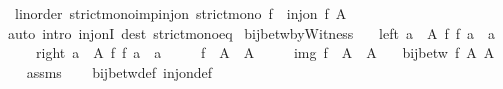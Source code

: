 \begin{isabellebody}
\isamarkupfalse%
\ {\isacharparenleft}{\kern0pt}\ linorder{\isacharparenright}{\kern0pt}\ strict{\isacharunderscore}{\kern0pt}mono{\isacharunderscore}{\kern0pt}imp{\isacharunderscore}{\kern0pt}inj{\isacharunderscore}{\kern0pt}on{\isacharcolon}{\kern0pt}\ {\isachardoublequoteopen}strict{\isacharunderscore}{\kern0pt}mono\ f\ {\isasymLongrightarrow}\ inj{\isacharunderscore}{\kern0pt}on\ f\ A{\isachardoublequoteclose}\isanewline
%
\isadelimproof
\ \ %
\endisadelimproof
%
\isatagproof
{}\isamarkupfalse%
\ {\isacharparenleft}{\kern0pt}auto\ intro{\isacharbang}{\kern0pt}{\isacharcolon}{\kern0pt}\ inj{\isacharunderscore}{\kern0pt}onI\ dest{\isacharcolon}{\kern0pt}\ strict{\isacharunderscore}{\kern0pt}mono{\isacharunderscore}{\kern0pt}eq{\isacharparenright}{\kern0pt}%
\endisatagproof
{\isafoldproof}%
%
\isadelimproof
\isanewline
%
\endisadelimproof
\isanewline
{}\isamarkupfalse%
\ bij{\isacharunderscore}{\kern0pt}betw{\isacharunderscore}{\kern0pt}byWitness{\isacharcolon}{\kern0pt}\isanewline
\ \ \ left{\isacharcolon}{\kern0pt}\ {\isachardoublequoteopen}{\isasymforall}a\ {\isasymin}\ A{\isachardot}{\kern0pt}\ f{\isacharprime}{\kern0pt}\ {\isacharparenleft}{\kern0pt}f\ a{\isacharparenright}{\kern0pt}\ {\isacharequal}{\kern0pt}\ a{\isachardoublequoteclose}\isanewline
\ \ \ \ \ right{\isacharcolon}{\kern0pt}\ {\isachardoublequoteopen}{\isasymforall}a{\isacharprime}{\kern0pt}\ {\isasymin}\ A{\isacharprime}{\kern0pt}{\isachardot}{\kern0pt}\ f\ {\isacharparenleft}{\kern0pt}f{\isacharprime}{\kern0pt}\ a{\isacharprime}{\kern0pt}{\isacharparenright}{\kern0pt}\ {\isacharequal}{\kern0pt}\ a{\isacharprime}{\kern0pt}{\isachardoublequoteclose}\isanewline
\ \ \ \ \ {\isachardoublequoteopen}f\ {\isacharbackquote}{\kern0pt}\ A\ {\isasymsubseteq}\ A{\isacharprime}{\kern0pt}{\isachardoublequoteclose}\isanewline
\ \ \ \ \ img{}{\isacharcolon}{\kern0pt}\ {\isachardoublequoteopen}f{\isacharprime}{\kern0pt}\ {\isacharbackquote}{\kern0pt}\ A{\isacharprime}{\kern0pt}\ {\isasymsubseteq}\ A{\isachardoublequoteclose}\isanewline
\ \ \ {\isachardoublequoteopen}bij{\isacharunderscore}{\kern0pt}betw\ f\ A\ A{\isacharprime}{\kern0pt}{\isachardoublequoteclose}\isanewline
%
\isadelimproof
\ \ %
\endisadelimproof
%
\isatagproof
{}\isamarkupfalse%
\ assms\isanewline
\ \ \isamarkupfalse%
\ bij{\isacharunderscore}{\kern0pt}betw{\isacharunderscore}{\kern0pt}def\ inj{\isacharunderscore}{\kern0pt}on{\isacharunderscore}{\kern0pt}def\isanewline

\end{isabellebody}
